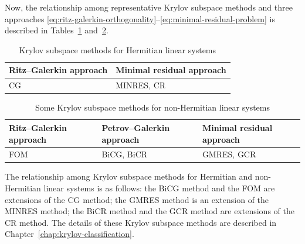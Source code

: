 Now, the relationship among representative Krylov subspace methods and three approaches \eqref{eq:ritz-galerkin-orthogonality}--\eqref{eq:minimal-residual-problem} is described in Tables~\ref{tab:hermitian-krylov-methods} and~\ref{tab:nonhermitian-krylov-methods}.

\begin{table}[htbp]
\centering
\caption{Krylov subspace methods for Hermitian linear systems}\label{tab:hermitian-krylov-methods}
\begin{tabular}{ll}\hline
Ritz--Galerkin approach & Minimal residual approach\\\hline
CG & MINRES, CR\\\hline
\end{tabular}
\end{table}

\begin{table}[htbp]
\centering
\caption{Some Krylov subspace methods for non-Hermitian linear systems}\label{tab:nonhermitian-krylov-methods}
\begin{tabular}{lll}\hline
Ritz--Galerkin approach & Petrov--Galerkin approach & Minimal residual approach\\\hline
FOM & BiCG, BiCR & GMRES, GCR\\\hline
\end{tabular}
\end{table}

The relationship among Krylov subspace methods for Hermitian and non-Hermitian linear systems is as follows: the BiCG method and the FOM are extensions of the CG method; the GMRES method is an extension of the MINRES method; the BiCR method and the GCR method are extensions of the CR method. The details of these Krylov subspace methods are described in Chapter~\ref{chap:krylov-classification}.
